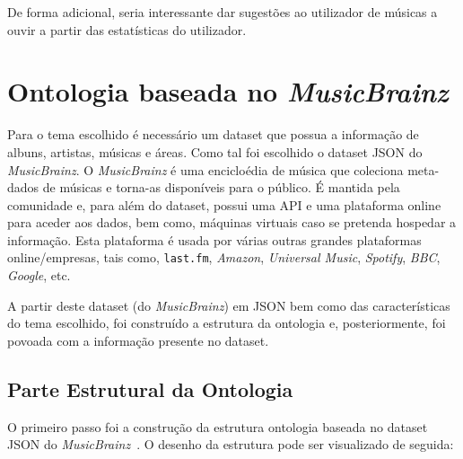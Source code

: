 \documentclass{article}
\begin{document}
De forma adicional, seria interessante dar sugestões ao utilizador de músicas a ouvir a partir das estatísticas do utilizador.

\section{Ontologia baseada no \textit{MusicBrainz}} \label{ontologia}

Para o tema escolhido é necessário um dataset que possua a informação de albuns, artistas, músicas e áreas. Como tal foi escolhido o dataset JSON do \textit{MusicBrainz}. O \textit{MusicBrainz} é uma encicloédia de música que coleciona meta-dados de músicas e torna-as disponíveis para o público. É mantida pela comunidade e, para além do dataset, possui uma API e uma plataforma online para aceder aos dados, bem como, máquinas virtuais caso se pretenda hospedar a informação. Esta plataforma é usada por várias outras grandes plataformas online/empresas, tais como, \texttt{last.fm}, \textit{Amazon}, \textit{Universal Music}, \textit{Spotify}, \textit{BBC}, \textit{Google}, etc.

A partir deste dataset (do \textit{MusicBrainz}) em JSON bem como das características do tema escolhido, foi construído a estrutura da ontologia e, posteriormente, foi povoada com a informação presente no dataset.

\subsection{Parte Estrutural da Ontologia}

O primeiro passo foi a construção da estrutura ontologia baseada no dataset JSON do \textit{MusicBrainz}~\cite{mbSchema}. O desenho da estrutura pode ser visualizado de seguida:
\end{document}
